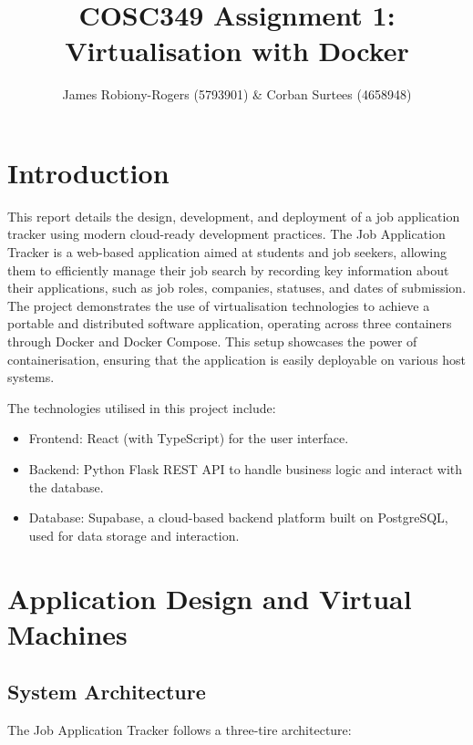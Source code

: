 \documentclass[a4paper, 11pt]{article}
\title{COSC349 Assignment 1: Virtualisation with Docker}
\author{James Robiony-Rogers (5793901) \& Corban Surtees (4658948)}
\begin{document}
\begin{titlepage}
    \maketitle
    \vfill
    \tableofcontents
\end{titlepage}

\pagebreak

\section{Introduction}

This report details the design, development, and deployment of a job application tracker using modern cloud-ready development practices. The Job Application Tracker is a web-based application aimed at students and job seekers, allowing them to efficiently manage their job search by recording key information about their applications, such as job roles, companies, statuses, and dates of submission. The project demonstrates the use of virtualisation technologies to achieve a portable and distributed software application, operating across three containers through Docker and Docker Compose. This setup showcases the power of containerisation, ensuring that the application is easily deployable on various host systems.

The technologies utilised in this project include:

\begin{itemize}
    \item Frontend: React (with TypeScript) for the user interface.
    \item Backend: Python Flask REST API to handle business logic and interact with the database.
    \item Database: Supabase, a cloud-based backend platform built on PostgreSQL, used for data storage and interaction.
\end{itemize}


\section{Application Design and Virtual Machines}

\subsection*{System Architecture}
The Job Application Tracker follows a three-tire architecture:
\end{document}
